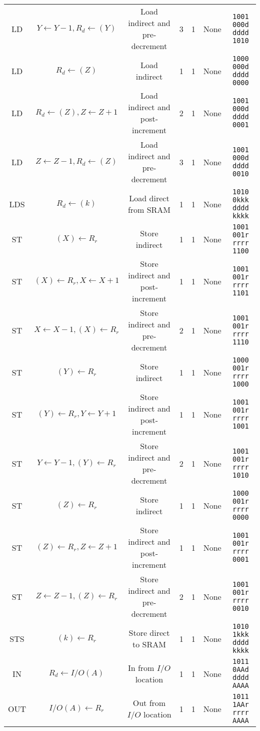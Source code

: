 \documentclass[11pt]{article}
\begin{document}
\begin{center}
\begin{longtable}{|c|c|c|c|c|c|c|}
LD & $Y \leftarrow Y - 1, R_d \leftarrow (Y)$ & Load indirect and pre-decrement & 3 & 1 & None & \texttt{1001 000d dddd 1010}\\
LD & $R_d \leftarrow (Z)$ & Load indirect & 1 & 1 & None & \texttt{1000 000d dddd 0000}\\
LD & $R_d \leftarrow (Z), Z \leftarrow Z + 1$ & Load indirect and post-increment & 2 & 1 & None & \texttt{1001 000d dddd 0001}\\
LD & $Z \leftarrow Z - 1, R_d \leftarrow (Z)$ & Load indirect and pre-decrement & 3 & 1 & None & \texttt{1001 000d dddd 0010}\\
LDS & $R_d \leftarrow (k)$ & Load direct from SRAM & 1 & 1 & None & \texttt{1010 0kkk dddd kkkk}\\
ST & $(X) \leftarrow R_r$ & Store indirect & 1 & 1 & None & \texttt{1001 001r rrrr 1100}\\
ST & $(X) \leftarrow R_r, X \leftarrow X + 1$ & Store indirect and post-increment & 1 & 1 & None & \texttt{1001 001r rrrr 1101}\\
ST & $X \leftarrow X - 1, (X) \leftarrow R_r$ & Store indirect and pre-decrement & 2 & 1 & None & \texttt{1001 001r rrrr 1110}\\
ST & $(Y) \leftarrow R_r$ & Store indirect & 1 & 1 & None & \texttt{1000 001r rrrr 1000}\\
ST & $(Y) \leftarrow R_r, Y \leftarrow Y + 1$ & Store indirect and post-increment & 1 & 1 & None & \texttt{1001 001r rrrr 1001}\\
ST & $Y \leftarrow Y - 1, (Y) \leftarrow R_r$ & Store indirect and pre-decrement & 2 & 1 & None & \texttt{1001 001r rrrr 1010}\\
ST & $(Z) \leftarrow R_r$ & Store indirect & 1 & 1 & None & \texttt{1000 001r rrrr 0000}\\
ST & $(Z) \leftarrow R_r, Z \leftarrow Z + 1$ & Store indirect and post-increment & 1 & 1 & None & \texttt{1001 001r rrrr 0001}\\
ST & $Z \leftarrow Z - 1, (Z) \leftarrow R_r$ & Store indirect and pre-decrement & 2 & 1 & None & \texttt{1001 001r rrrr 0010}\\
STS & $(k) \leftarrow R_r$ & Store direct to SRAM & 1 & 1 & None & \texttt{1010 1kkk dddd kkkk}\\
IN & $R_d \leftarrow I/O(A)$ & In from $I/O$ location & 1 & 1 & None & \texttt{1011 0AAd dddd AAAA}\\
OUT & $I/O(A) \leftarrow R_r$ & Out from $I/O$ location & 1 & 1 & None & \texttt{1011 1AAr rrrr AAAA}\\

\end{longtable}
\end{center}
\end{document}
